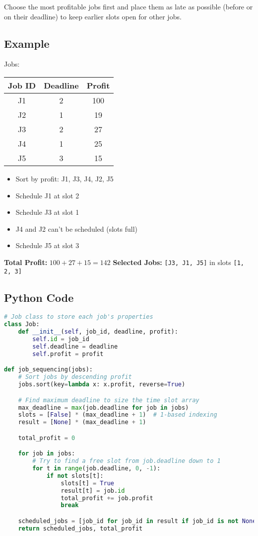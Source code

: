 \documentclass[14pt]{extarticle}
\begin{document}
\begin{tcolorbox}[colback=white, colframe=black, title=Key Idea]
Choose the most profitable jobs first and place them as late as possible (before or on their deadline) to keep earlier slots open for other jobs.
\end{tcolorbox}

\subsection*{Example}

Jobs:  
\begin{center}
\begin{tabular}{|c|c|c|}
\hline
Job ID & Deadline & Profit \\
\hline
J1 & 2 & 100 \\
J2 & 1 & 19 \\
J3 & 2 & 27 \\
J4 & 1 & 25 \\
J5 & 3 & 15 \\
\hline
\end{tabular}
\end{center}
\newpage
\begin{itemize}
    \item Sort by profit: J1, J3, J4, J2, J5
    \item Schedule J1 at slot 2
    \item Schedule J3 at slot 1
    \item J4 and J2 can't be scheduled (slots full)
    \item Schedule J5 at slot 3
\end{itemize}

\textbf{Total Profit:} $100 + 27 + 15 = 142$  
\textbf{Selected Jobs:} \texttt{[J3, J1, J5]} in slots \texttt{[1, 2, 3]}

\subsection*{Python Code}
\begin{lstlisting}[language=Python]
# Job class to store each job's properties
class Job:
    def __init__(self, job_id, deadline, profit):
        self.id = job_id
        self.deadline = deadline
        self.profit = profit

def job_sequencing(jobs):
    # Sort jobs by descending profit
    jobs.sort(key=lambda x: x.profit, reverse=True)

    # Find maximum deadline to size the time slot array
    max_deadline = max(job.deadline for job in jobs)
    slots = [False] * (max_deadline + 1)  # 1-based indexing
    result = [None] * (max_deadline + 1)

    total_profit = 0

    for job in jobs:
        # Try to find a free slot from job.deadline down to 1
        for t in range(job.deadline, 0, -1):
            if not slots[t]:
                slots[t] = True
                result[t] = job.id
                total_profit += job.profit
                break

    scheduled_jobs = [job_id for job_id in result if job_id is not None]
    return scheduled_jobs, total_profit
\end{lstlisting}
\end{document}
